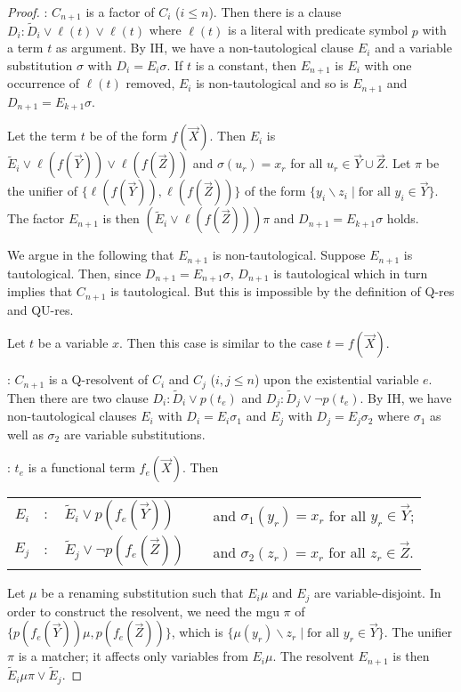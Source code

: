 \documentclass{llncs}
\newcommand{\ih}{{\sf IH}}
\newcommand{\sccase}[1]{\noindent {\sc Case~#1}}
\newcommand{\scsubcase}[2]{\noindent {\sc Subcase~#1.#2}}
\newcommand{\qres}{\mbox{\sf Q-res}}
\newcommand{\qures}{\mbox{\sf QU-res}}
\begin{document}
\begin{proof}
\medskip
\sccase{3}: $C_{n+1}$ is a factor of $C_i$ ($i\leq n$).  Then there is
a clause $D_i\colon \widetilde{D}_i \lor \ell(t) \lor \ell(t)$
where $\ell(t)$ is a literal with predicate symbol $p$ with a term $t$
as argument.  By \ih, we have a non-tautological clause $E_i$ and a
variable substitution $\sigma$ with $D_i = E_i\sigma$. If $t$ is a
constant, then $E_{n+1}$ is $E_i$ with one occurrence of $\ell(t)$
removed, $E_i$ is non-tautological and so is $E_{n+1}$ and $D_{n+1} =
E_{k+1}\sigma$.

Let the term $t$ be of the form $f(\vec{X})$. Then $E_i$ is 
$\widetilde{E}_i \lor \ell(f(\vec{Y})) \lor \ell(f(\vec{Z}))$ and
$\sigma(u_r)= x_r$ for all $u_r \in \vec{Y} \cup \vec{Z}$.
Let $\pi$ be the unifier of $\{\ell(f(\vec{Y})), \ell(f(\vec{Z}))\}$
of the form $\{y_i\backslash z_i \mid \text{for all $y_i\in
  \vec{Y}$}\}$. The factor $E_{n+1}$ is then $(\widetilde{E}_i \lor
\ell(f(\vec{Z})))\pi$ and $D_{n+1} = E_{k+1}\sigma$ holds.

We argue in the following that $E_{n+1}$ is non-tautological.  Suppose
$E_{n+1}$ is tautological. Then, since $D_{n+1} = E_{n+1}\sigma$,
$D_{n+1}$ is tautological which in turn implies that $C_{n+1}$ is
tautological. But this is impossible by the definition of \qres{} and
\qures.



Let  $t$ be a variable $x$. Then this case is similar to the case
$t=f(\vec{X})$. 
 
\medskip
\sccase{4}: $C_{n+1}$ is a Q-resolvent of $C_i$ and $C_j$ ($i,j\leq
n$) upon the existential variable $e$.  Then there are two clause
$D_i\colon \widetilde{D}_i \lor p(t_e)$ and $D_j\colon \widetilde{D}_j
\lor \neg p(t_e)$. By \ih, we have non-tautological clauses $E_i$ with
$D_i = E_i\sigma_1$ and $E_j$ with $D_j = E_j\sigma_2$ where
$\sigma_1$ as well as $\sigma_2$ are variable substitutions.

\scsubcase{4}{1}: $t_e$ is a functional term $f_e(\vec{X})$.  Then

\begin{tabular}{rllcl}
$E_i$ & $\colon$ & $\widetilde{E}_i \lor p(f_e(\vec{Y}))$ & &
and 
$\sigma_1(y_r)=x_r$ for all  $y_r \in \vec{Y}$;
\\
$E_j$ & $\colon$ & $\widetilde{E}_j \lor \neg p(f_e(\vec{Z}))$ & &
and 
$\sigma_2(z_r)=x_r$ for all  $z_r \in \vec{Z}$.
\\ 
\end{tabular}

\noindent
Let $\mu$ be a renaming substitution such that $E_i\mu$ and $E_j$ are
variable-disjoint.  In order to construct the resolvent, we need the
mgu $\pi$ of $\{p(f_e(\vec{Y}))\mu, p(f_e(\vec{Z}))\}$, which is
$\{\mu(y_r) \backslash z_r \mid \text{for all $y_r\in
  \vec{Y}$}\}$. The unifier $\pi$ is a matcher; it affects only
variables from $E_i\mu$. The resolvent $E_{n+1}$ is then
$\widetilde{E}_i \mu \pi \lor \widetilde{E}_j$.


\end{proof}
\end{document}

